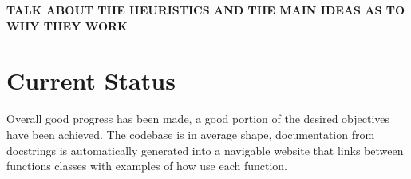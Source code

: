 \documentclass{article}
\begin{document}
\textbf{TALK ABOUT THE HEURISTICS AND THE MAIN IDEAS AS TO WHY THEY WORK}




\section{Current Status}

Overall good progress has been made, a good portion of the desired objectives have been achieved.
The codebase is in average shape, documentation from docstrings is automatically generated into a navigable website that links between functions classes with examples of how use each function.
\end{document}
